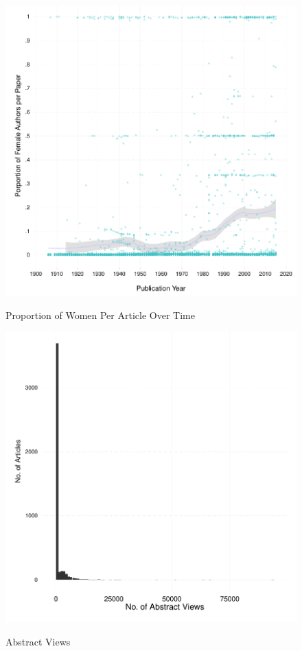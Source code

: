 \documentclass[12pt]{article}
\begin{document}
\begin{figure}[htbp]
\centering
\caption{Proportion of Women Per Article Over Time}
\includegraphics[scale=.85]{../figs/gender_authors_per_article_over_time.pdf}
\label{fig:women}
\end{figure}

\begin{figure}[htbp]
\centering
\caption{Abstract Views}
\includegraphics[scale=.85]{../figs/abstract_views.pdf}
\label{fig:abstracts}
\end{figure}
\end{document}
